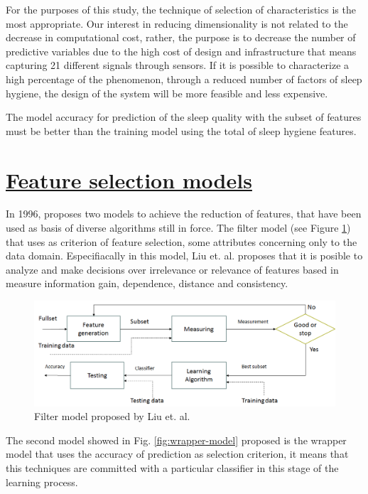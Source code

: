 \documentclass[]{book}
\begin{document}
For the purposes of this study, the technique of selection of
characteristics is the most appropriate. Our interest in reducing
dimensionality is not related to the decrease in computational cost,
rather, the purpose is to decrease the number of predictive variables
due to the high cost of design and infrastructure that means capturing
21 different signals through sensors. If it is possible to characterize
a high percentage of the phenomenon, through a reduced number of factors
of sleep hygiene, the design of the system will be more feasible and
less expensive.

The model accuracy for prediction of the sleep quality with the subset
of features must be better than the training model using the total of
sleep hygiene features.

\section{\texorpdfstring{\protect\hyperlink{feature-selection-model}{Feature
selection
models}}{Feature selection models}}\label{feature-selection-models}

In 1996, \citep{Liu1998} proposes two models to achieve the reduction of
features, that have been used as basis of diverse algorithms still in
force. The filter model (see Figure \ref{fig:filter-model}) that uses as
criterion of feature selection, some attributes concerning only to the
data domain. Especifiacally in this model, Liu et. al. proposes that it
is posible to analyze and make decisions over irrelevance or relevance
of features based in measure information gain, dependence, distance and
consistency.

\begin{figure}[H]

{\centering \includegraphics[width=0.6\linewidth]{images/filter-model} 

}

\caption{Filter model proposed by Liu et. al.}\label{fig:filter-model}
\end{figure}

The second model showed in Fig. \ref{fig:wrapper-model} proposed is the
wrapper model that uses the accuracy of prediction as selection
criterion, it means that this techniques are committed with a particular
classifier in this stage of the learning process.
\end{document}
